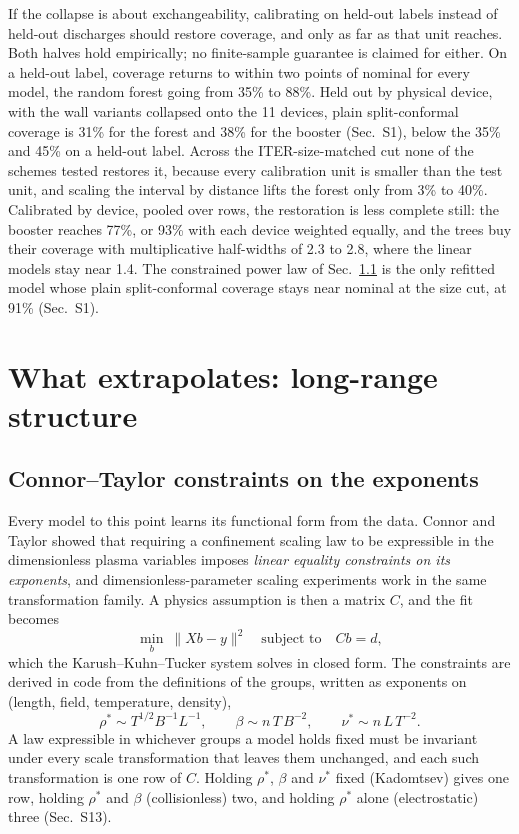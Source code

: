 \documentclass[aip,pop,preprint,amsmath,amssymb]{revtex4-2}
\begin{document}
If the collapse is about exchangeability, calibrating on held-out labels
instead of held-out discharges should restore coverage, and only as far as
that unit reaches. Both halves hold empirically; no finite-sample guarantee is
claimed for either. On a held-out label, coverage returns to within two
points of nominal for every model, the random forest going from 35\% to 88\%.
Held out by physical device, with the wall variants collapsed onto the 11
devices, plain split-conformal coverage is 31\% for the forest and 38\% for
the booster (Sec.~S1), below the 35\% and 45\% on a held-out label.
Across the ITER-size-matched cut none of the schemes tested restores it,
because every calibration unit is smaller than the test unit, and scaling the
interval by distance lifts the forest only from 3\% to 40\%. Calibrated by
device, pooled over rows, the restoration is less complete still: the booster
reaches 77\%, or 93\% with each device weighted equally, and the trees buy
their coverage with multiplicative half-widths of 2.3 to 2.8, where the
linear models stay near 1.4.
The constrained power law of Sec.~\ref{sec:dimensional} is the only refitted
model whose plain split-conformal coverage stays near nominal at the size cut,
at 91\% (Sec.~S1).

\section{What extrapolates: long-range structure}
\label{sec:structure}

\subsection{Connor--Taylor constraints on the exponents}
\label{sec:dimensional}

Every model to this point learns its functional form from the data. Connor and
Taylor\cite{connor} showed that requiring a confinement scaling law to be
expressible in the dimensionless plasma variables imposes \emph{linear equality
constraints on its exponents}, and dimensionless-parameter scaling experiments
work in the same transformation family\cite{petty,luce}. A physics assumption
is then a matrix $C$, and the fit becomes
\begin{equation}
\min_{b}\ \lVert Xb - y \rVert^{2} \quad \text{subject to} \quad Cb = d ,
\end{equation}
which the Karush--Kuhn--Tucker system solves in closed form. The constraints are
derived in code from the definitions of the groups, written as exponents on
(length, field, temperature, density),
\begin{equation}
\rho^{*} \sim T^{1/2} B^{-1} L^{-1}, \qquad
\beta \sim n\,T\,B^{-2}, \qquad
\nu^{*} \sim n\,L\,T^{-2}.
\label{eq:groups}
\end{equation}
A law expressible in whichever groups a model holds fixed must be invariant
under every scale transformation that leaves them unchanged, and each such
transformation is one row of $C$. Holding $\rho^{*}$, $\beta$ and $\nu^{*}$
fixed (Kadomtsev\cite{kadomtsev}) gives one row, holding $\rho^{*}$ and $\beta$
(collisionless) two, and holding $\rho^{*}$ alone (electrostatic) three
(Sec.~S13).
\end{document}

